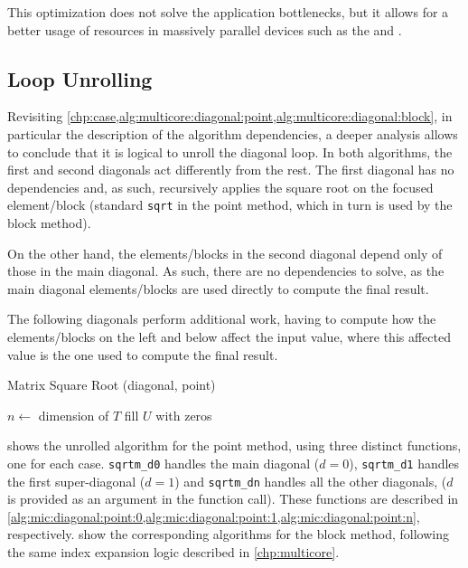 \documentclass[../thesis]{subfiles}
\begin{document}
		This optimization does not solve the application bottlenecks, but it allows for a better usage of resources in massively parallel devices such as the \intel\xeonphi and \gpus.

		\subsection{Loop Unrolling}
		Revisiting \cref{chp:case,alg:multicore:diagonal:point,alg:multicore:diagonal:block}, in particular the description of the algorithm dependencies, a deeper analysis allows to conclude that it is logical to unroll the diagonal loop. In both algorithms, the first and second diagonals act differently from the rest. The first diagonal has no dependencies and, as such, recursively applies the square root on the focused element/block (standard \texttt{sqrt} in the point method, which in turn is used by the block method).

		On the other hand, the elements/blocks in the second diagonal depend only of those in the main diagonal. As such, there are no dependencies to solve, as the main diagonal elements/blocks are used directly to compute the final result.

		The following diagonals perform additional work, having to compute how the elements/blocks on the left and below affect the input value, where this affected value is the one used to compute the final result.

		\begin{algorithm}[htp]
			\caption[Matrix Square Root Unrolled (diagonal, point)]{Matrix Square Root (diagonal, point)}
			\label{alg:mic:diagonal:point}
			\DontPrintSemicolon



			$n \leftarrow$ dimension of $T$\;
			fill $U$ with zeros\;

			\;
			\;
		\end{algorithm}

		 shows the unrolled algorithm for the point method, using three distinct functions, one for each case. \texttt{sqrtm\_d0} handles the main diagonal ($d = 0$), \texttt{sqrtm\_d1} handles the first super-diagonal ($d = 1$) and \texttt{sqrtm\_dn} handles all the other diagonals, ($d$ is provided as an argument in the function call). These functions are described in \cref{alg:mic:diagonal:point:0,alg:mic:diagonal:point:1,alg:mic:diagonal:point:n}, respectively.  show the corresponding algorithms for the block method, following the same index expansion logic described in \cref{chp:multicore}.
\end{document}
